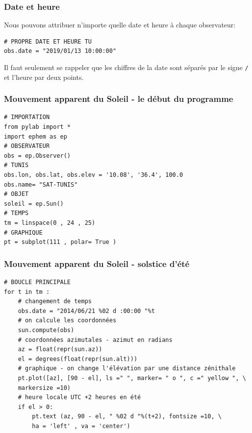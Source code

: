 \documentclass{beamer}
\begin{document}
\begin{frame}
\frametitle{Date et heure}

Nous pouvons attribuer n'importe quelle date et heure à chaque observateur:
\begin{verbatim}
# PROPRE DATE ET HEURE TU
obs.date = "2019/01/13 10:00:00"
\end{verbatim}
Il faut seulement se rappeler que les chiffres de la date sont séparés par le signe \texttt{/} et l'heure par deux points.
\end{frame}

\begin{frame}
\frametitle{Mouvement apparent du Soleil - le début du programme}

\begin{verbatim}
# IMPORTATION
from pylab import *
import ephem as ep
# OBSERVATEUR
obs = ep.Observer()
# TUNIS
obs.lon, obs.lat, obs.elev = '10.08', '36.4', 100.0
obs.name= "SAT-TUNIS"
# OBJET
soleil = ep.Sun()
# TEMPS
tm = linspace(0 , 24 , 25)
# GRAPHIQUE
pt = subplot(111 , polar= True )
\end{verbatim}
\end{frame}

\begin{frame}
\frametitle{Mouvement apparent du Soleil - solstice d'été}

\begin{verbatim}
# BOUCLE PRINCIPALE
for t in tm :
    # changement de temps
    obs.date = "2014/06/21 %02 d :00:00 "%t
    # on calcule les coordonnées
    sun.compute(obs)
    # coordonnées azimutales - azimut en radians
    az = float(repr(sun.az))
    el = degrees(float(repr(sun.alt)))
    # graphique - on change l'élévation par une distance zénithale
    pt.plot([az], [90 - el], ls =" ", marker= " o ", c =" yellow ", \
    markersize =10)
    # heure locale UTC +2 heures en été
    if el > 0:
        pt.text (az, 90 - el, " %02 d "%(t+2), fontsize =10, \
        ha = 'left' , va = 'center')
\end{verbatim}
\end{frame}
\end{document}
